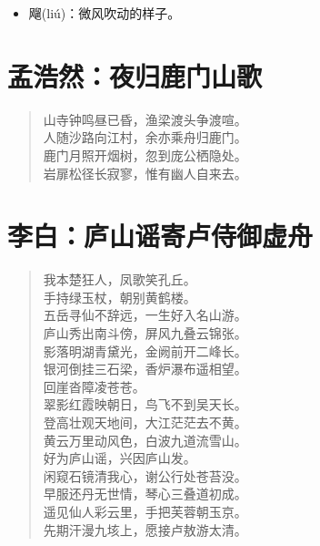\documentclass[12pt,oneside]{book}
\newenvironment{shici}{
\begin{verse}
\centering\large\hspace{12pt}}
{\end{verse}}
\begin{document}
\begin{itemize}
\item 飗(liú)：微风吹动的样子。
\end{itemize}

\chapter{孟浩然：夜归鹿门山歌}
\begin{shici}
山寺钟鸣昼已昏，渔梁渡头争渡喧。\\
人随沙路向江村，余亦乘舟归鹿门。\\
鹿门月照开烟树，忽到庞公栖隐处。\\
岩扉松径长寂寥，惟有幽人自来去。
\end{shici}

\chapter{李白：庐山谣寄卢侍御虚舟}
\begin{shici}
我本楚狂人，凤歌笑孔丘。\\
手持绿玉杖，朝别黄鹤楼。\\
五岳寻仙不辞远，一生好入名山游。\\
庐山秀出南斗傍，屏风九叠云锦张。\\
影落明湖青黛光，金阙前开二峰长。\\
银河倒挂三石梁，香炉瀑布遥相望。\\
回崖沓障凌苍苍。\\
翠影红霞映朝日，鸟飞不到吴天长。\\
登高壮观天地间，大江茫茫去不黄。\\
黄云万里动风色，白波九道流雪山。\\
好为庐山谣，兴因庐山发。\\
闲窥石镜清我心，谢公行处苍苔没。\\
早服还丹无世情，琴心三叠道初成。\\
遥见仙人彩云里，手把芙蓉朝玉京。\\
先期汗漫九垓上，愿接卢敖游太清。
\end{shici}
\end{document}
